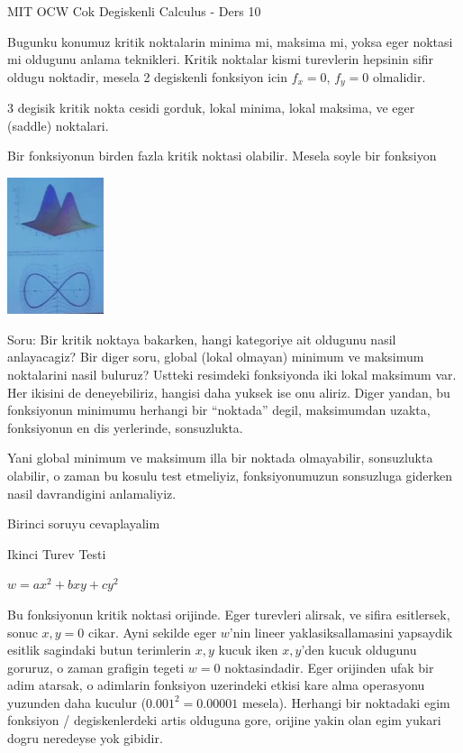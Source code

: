 \documentclass[12pt,fleqn]{article}
\begin{document}
MIT OCW Cok Degiskenli Calculus - Ders 10

Bugunku konumuz kritik noktalarin minima mi, maksima mi, yoksa eger noktasi
mi oldugunu anlama teknikleri. Kritik noktalar kismi turevlerin hepsinin
sifir oldugu noktadir, mesela 2 degiskenli fonksiyon icin $f_x=0$, $f_y=0$
olmalidir. 

3 degisik kritik nokta cesidi gorduk, lokal minima, lokal maksima, ve
eger (saddle) noktalari. 

Bir fonksiyonun birden fazla kritik noktasi olabilir. Mesela soyle bir
fonksiyon

\includegraphics[height=4cm]{10_1.png}

Soru: Bir kritik noktaya bakarken, hangi kategoriye ait oldugunu nasil
anlayacagiz? Bir diger soru, global (lokal olmayan) minimum ve maksimum
noktalarini nasil buluruz?  Ustteki resimdeki fonksiyonda iki lokal
maksimum var. Her ikisini de deneyebiliriz, hangisi daha yuksek ise onu
aliriz. Diger yandan, bu fonksiyonun minimumu herhangi bir ``noktada'' degil,
maksimumdan uzakta, fonksiyonun en dis yerlerinde, sonsuzlukta. 

Yani global minimum ve maksimum illa bir noktada olmayabilir, sonsuzlukta
olabilir, o zaman bu kosulu test etmeliyiz, fonksiyonumuzun sonsuzluga
giderken nasil davrandigini anlamaliyiz.

Birinci soruyu cevaplayalim

Ikinci Turev Testi

$w = ax^2 + bxy + cy^2$

Bu fonksiyonun kritik noktasi orijinde. Eger turevleri alirsak, ve sifira
esitlersek, sonuc $x,y=0$ cikar. Ayni sekilde eger $w$'nin lineer
yaklasiksallamasini yapsaydik esitlik sagindaki butun terimlerin $x,y$
kucuk iken $x,y$'den kucuk oldugunu goruruz, o zaman grafigin tegeti $w=0$
noktasindadir. Eger orijinden ufak bir adim atarsak, o adimlarin fonksiyon
uzerindeki etkisi kare alma operasyonu yuzunden daha kuculur ($0.001^2 =
0.00001$ 
mesela). Herhangi bir noktadaki egim fonksiyon / degiskenlerdeki artis
olduguna gore, orijine yakin olan egim yukari dogru neredeyse yok gibidir. 
\end{document}
